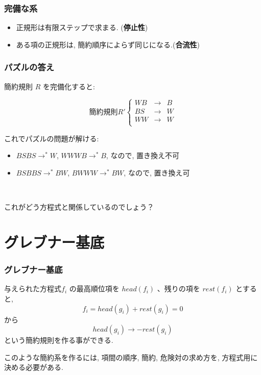 \begin{frame}\frametitle{完備な系}
\begin{itemize}
\item 正規形は有限ステップで求まる. 
({\bf 停止性})
\item ある項の正規形は, 簡約順序によらず同じになる.({\bf 合流性})
\end{itemize}
\end{frame}

\begin{frame}\frametitle{パズルの答え}

簡約規則 $R$ を完備化すると:

\[
\mbox{簡約規則} R' \left\{ \begin{array}{rll}
WB & \rightarrow  &  B\\
BS & \rightarrow   & W  \\
WW & \rightarrow   & W  \\
	  \end{array}
\right.
\]

\begin{block}{これでパズルの問題が解ける:}
\begin{itemize}
\item $BSBS \rightarrow^* W$, 
$WWWB \rightarrow^* B$, なので, 置き換え不可

\item $BSBBS \rightarrow^* BW$, 
$BWWW \rightarrow^* BW$, なので, 置き換え可
\end{itemize} 
\end{block}
\ \\
\begin{alertblock}{これがどう方程式と関係しているのでしょう？}
\end{alertblock}
\end{frame}

\section{グレブナー基底}
\begin{frame}\frametitle{グレブナー基底}

与えられた方程式$f_i$ の最高順位項を $head(f_i)$ 、残りの項を 
$rest(f_i)$ とすると, 
\[ f_i = head(g_i) + rest(g_i)  = 0 \]
から
\[ head(g_i) \rightarrow - rest(g_i) \]
という簡約規則を作る事ができる.

このような簡約系を作るには, 項間の順序, 簡約, 危険対の求め方を,
方程式用に決める必要がある.
\end{frame}

